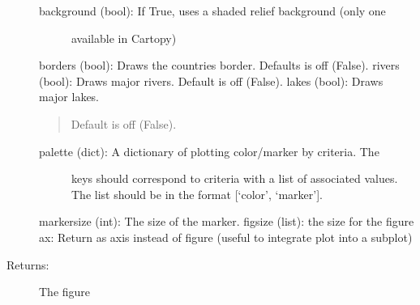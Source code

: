 \documentclass[letterpaper,10pt,english]{sphinxmanual}
\begin{document}
\begin{fulllineitems}
\begin{description}
\begin{description}
\item[{background (bool): If True, uses a shaded relief background (only one }] \leavevmode
available in Cartopy)

\end{description}

borders (bool): Draws the countries border. Defaults is off (False). 
rivers (bool): Draws major rivers. Default is off (False).
lakes (bool): Draws major lakes.
\begin{quote}

Default is off (False).
\end{quote}
\begin{description}
\item[{palette (dict): A dictionary of plotting color/marker by criteria. The}] \leavevmode
keys should correspond to  criteria with a list of 
associated values. The list should be in the format 
{[}‘color’, ‘marker’{]}.

\end{description}

markersize (int): The size of the marker.
figsize (list): the size for the figure
ax: Return as axis instead of figure (useful to integrate plot into a subplot)

\item[{Returns:}] \leavevmode
The figure

\end{description}

\end{fulllineitems}

\end{document}
